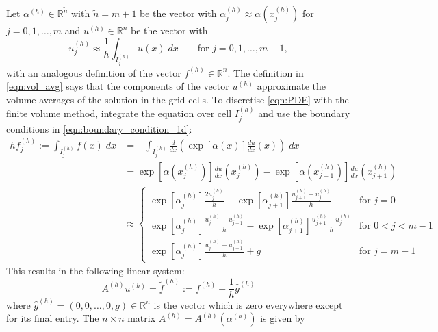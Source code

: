 \documentclass[11pt]{article}
\begin{document}
Let $\alpha^{(h)}\in\mathbb{R}^{\widetilde{n}}$ with $\widetilde{n}=m+1$ be the vector with $\alpha^{(h)}_j\approx \alpha(x^{(h)}_j)$ for $j=0,1,\dots,m$ and $u^{(h)}\in\mathbb{R}^{n}$ be the vector with
\begin{equation}
    u^{(h)}_j\approx \frac{1}{h}\int_{I^{(h)}_j} u(x)\; dx\qquad\text{for $j=0,1,\dots,m-1$},\label{eqn:vol_avg}
\end{equation}
with an analogous definition of the vector $f^{(h)}\in \mathbb{R}^n$. The definition in \eqref{eqn:vol_avg} says that the components of the vector $u^{(h)}$ approximate the volume averages of the solution in the grid cells. To discretise \eqref{eqn:PDE} with the finite volume method, integrate the equation over cell $I_j^{(h)}$ and use the boundary conditions in \eqref{eqn:boundary_condition_1d}:
\begin{equation}
    \begin{aligned}
       hf^{(h)}_j :=\int_{I^{(h)}_j} f(x)\;dx&=
    -\int_{I^{(h)}_j} \frac{d}{dx}\left(\exp[\alpha(x)]\frac{du}{dx}(x)\right)\;dx \\
    &=\exp[\alpha(x^{(h)}_{j})]\frac{du}{dx}(x^{(h)}_{j})-\exp[\alpha(x^{(h)}_{j+1})]\frac{du}{dx}(x^{(h)}_{j+1})\\
    &\approx \begin{cases}
        \exp[\alpha^{(h)}_{j}]\frac{2u^{(h)}_j}{h}-\exp[\alpha^{(h)}_{j+1}]\frac{u^{(h)}_{j+1}-u^{(h)}_j}{h}&\text{for $j=0$}\\
        \exp[\alpha^{(h)}_{j}]\frac{u^{(h)}_j-u^{(h)}_{j-1}}{h}-\exp[\alpha^{(h)}_{j+1}]\frac{u^{(h)}_{j+1}-u^{(h)}_j}{h}&\text{for $0<j<m-1$}\\ 
        \exp[\alpha^{(h)}_{j}]\frac{u^{(h)}_j-u^{(h)}_{j-1}}{h}+g&\text{for $j=m-1$}
    \end{cases}
    \end{aligned}  
\end{equation}
This results in the following linear system:
\begin{equation}
A^{(h)} u^{(h)} = \widetilde{f}^{(h)} := f^{(h)}-\frac{1}{h}\widehat{g}^{(h)} \label{eqn:discrete_system_1d}
\end{equation}
where $\widehat{g}^{(h)}=(0,0,\dots,0,g)\in\mathbb{R}^{n}$ is the vector which is zero everywhere except for its final entry. The $n\times n$ matrix $A^{(h)} = A^{(h)}(\alpha^{(h)})$ is given by
\end{document}
